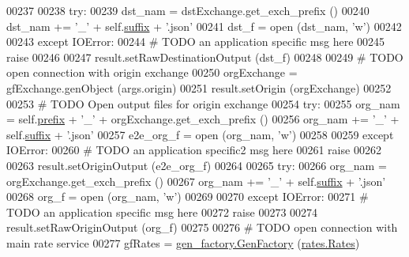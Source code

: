 \begin{DoxyCode}
00237             
00238         \textcolor{keywordflow}{try}:
00239             dst\_nam  = dstExchange.get\_exch\_prefix ()
00240             dst\_nam += \textcolor{stringliteral}{'\_'} + self.\hyperlink{classe2e_1_1_application_a4d824ad36b051d2d629edb314385df0d}{suffix} + \textcolor{stringliteral}{'.json'}
00241             dst\_f = open (dst\_nam, \textcolor{stringliteral}{'w'})
00242             
00243         \textcolor{keywordflow}{except} IOError:
00244             \textcolor{comment}{# TODO an application specific msg here}
00245             \textcolor{keywordflow}{raise}
00246             
00247         result.setRawDestinationOutput (dst\_f)
00248             
00249         \textcolor{comment}{# TODO open connection with origin exchange}
00250         orgExchange = gfExchange.genObject (args.origin)
00251         result.setOrigin (orgExchange)
00252             
00253         \textcolor{comment}{# TODO Open output files for origin exchange}
00254         \textcolor{keywordflow}{try}:
00255             org\_nam  =  self.\hyperlink{classe2e_1_1_application_a027ff25e5409ae17584978a09fc2611a}{prefix} + \textcolor{stringliteral}{'\_'} + orgExchange.get\_exch\_prefix ()
00256             org\_nam += \textcolor{stringliteral}{'\_'} + self.\hyperlink{classe2e_1_1_application_a4d824ad36b051d2d629edb314385df0d}{suffix} + \textcolor{stringliteral}{'.json'}
00257             e2e\_org\_f = open (org\_nam, \textcolor{stringliteral}{'w'})
00258             
00259         \textcolor{keywordflow}{except} IOError:
00260             \textcolor{comment}{# TODO an application specific2 msg here}
00261             \textcolor{keywordflow}{raise}
00262 
00263         result.setOriginOutput (e2e\_org\_f)
00264             
00265         \textcolor{keywordflow}{try}:
00266             org\_nam  = orgExchange.get\_exch\_prefix ()
00267             org\_nam += \textcolor{stringliteral}{'\_'} + self.\hyperlink{classe2e_1_1_application_a4d824ad36b051d2d629edb314385df0d}{suffix} + \textcolor{stringliteral}{'.json'}
00268             org\_f = open (org\_nam, \textcolor{stringliteral}{'w'})
00269             
00270         \textcolor{keywordflow}{except} IOError:
00271             \textcolor{comment}{# TODO an application specific msg here}
00272             \textcolor{keywordflow}{raise}
00273             
00274         result.setRawOriginOutput (org\_f)
00275             
00276         \textcolor{comment}{# TODO open connection with main rate service}
00277         gfRates = \hyperlink{classgen__factory_1_1_gen_factory}{gen\_factory.GenFactory} (\hyperlink{classrates_1_1_rates}{rates.Rates})

\end{DoxyCode}

